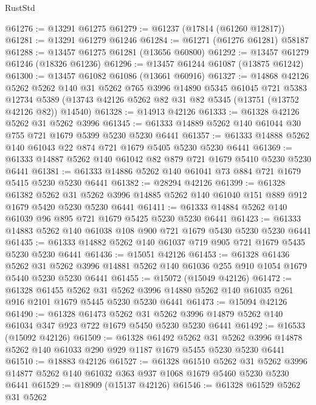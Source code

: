 \begin{lexlean}{RustStd}
\begin{coremodule}
@61276 := @13291 @61275
@61279 := @61237 (@17814 (@61260 @12817))
@61281 := @13291 @61279 @61246
@61284 := @61271 (@61276 @61281) @58187
@61288 := @13457 @61275 @61281 (@13656 @60800)
@61292 := @13457 @61279 @61246 (@18326 @61236)
@61296 := @13457 @61244 @61087 (@13875 @61242)
@61300 := @13457 @61082 @61086 (@13661 @60916)
@61327 := @14868
    @42126
    @5262
    @5262
    @140
    @31
    @5262
    @765
    @3996
    @14890
    @5345
    @61045
    @721
    @5383
    @12734
    @5389
    (@13743 @42126 @5262 @82 @31 @82 @5345 (@13751 (@13752 @42126 @82)) @14540)
@61328 := @14913 @42126
@61333 := @61328 @42126 @5262 @31 @5262 @3996
@61345 := @61333 @14889 @5262 @140 @61044 @30 @755 @721 @1679 @5399 @5230 @5230 @6441
@61357 := @61333 @14888 @5262 @140 @61043 @22 @874 @721 @1679 @5405 @5230 @5230 @6441
@61369 := @61333 @14887 @5262 @140 @61042 @82 @879 @721 @1679 @5410 @5230 @5230 @6441
@61381 := @61333 @14886 @5262 @140 @61041 @73 @884 @721 @1679 @5415 @5230 @5230 @6441
@61382 := @28294 @42126
@61399 := @61328
    @61382
    @5262
    @31
    @5262
    @3996
    @14885
    @5262
    @140
    @61040
    @151
    @889
    @912
    @1679
    @5420
    @5230
    @5230
    @6441
@61411 := @61333 @14884 @5262 @140 @61039 @96 @895 @721 @1679 @5425 @5230 @5230 @6441
@61423 := @61333 @14883 @5262 @140 @61038 @108 @900 @721 @1679 @5430 @5230 @5230 @6441
@61435 := @61333 @14882 @5262 @140 @61037 @719 @905 @721 @1679 @5435 @5230 @5230 @6441
@61436 := @15051 @42126
@61453 := @61328
    @61436
    @5262
    @31
    @5262
    @3996
    @14881
    @5262
    @140
    @61036
    @255
    @910
    @1054
    @1679
    @5440
    @5230
    @5230
    @6441
@61455 := @15072 (@15049 @42126)
@61472 := @61328
    @61455
    @5262
    @31
    @5262
    @3996
    @14880
    @5262
    @140
    @61035
    @261
    @916
    @2101
    @1679
    @5445
    @5230
    @5230
    @6441
@61473 := @15094 @42126
@61490 := @61328
    @61473
    @5262
    @31
    @5262
    @3996
    @14879
    @5262
    @140
    @61034
    @347
    @923
    @722
    @1679
    @5450
    @5230
    @5230
    @6441
@61492 := @16533 (@15092 @42126)
@61509 := @61328
    @61492
    @5262
    @31
    @5262
    @3996
    @14878
    @5262
    @140
    @61033
    @290
    @929
    @1187
    @1679
    @5455
    @5230
    @5230
    @6441
@61510 := @18883 @42126
@61527 := @61328
    @61510
    @5262
    @31
    @5262
    @3996
    @14877
    @5262
    @140
    @61032
    @363
    @937
    @1068
    @1679
    @5460
    @5230
    @5230
    @6441
@61529 := @18909 (@15137 @42126)
@61546 := @61328
    @61529
    @5262
    @31
    @5262

\end{coremodule}
\end{lexlean}
